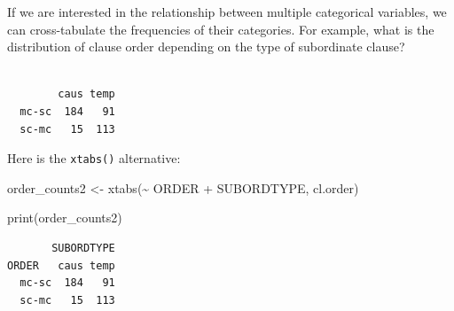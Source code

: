 \documentclass[
  11pt,
  letterpaper,
  DIV=11,
  numbers=noendperiod]{scrreprt}
\newenvironment{Shaded}{\begin{snugshade}}{\end{snugshade}}
\newcommand{\FunctionTok}[1]{\textcolor[rgb]{0.28,0.35,0.67}{#1}}
\newcommand{\NormalTok}[1]{\textcolor[rgb]{0.00,0.23,0.31}{#1}}
\newcommand{\OtherTok}[1]{\textcolor[rgb]{0.00,0.23,0.31}{#1}}
\newcommand{\SpecialCharTok}[1]{\textcolor[rgb]{0.37,0.37,0.37}{#1}}
\begin{document}
If we are interested in the relationship between multiple categorical
variables, we can cross-tabulate the frequencies of their categories.
For example, what is the distribution of clause order depending on the
type of subordinate clause?

\begin{Shaded}
\end{Shaded}

\begin{verbatim}
       
        caus temp
  mc-sc  184   91
  sc-mc   15  113
\end{verbatim}

Here is the \texttt{xtabs()} alternative:

\begin{Shaded}
\begin{Highlighting}[]
\NormalTok{order\_counts2 }\OtherTok{\textless{}{-}} \FunctionTok{xtabs}\NormalTok{(}\SpecialCharTok{\textasciitilde{}}\NormalTok{ ORDER }\SpecialCharTok{+}\NormalTok{ SUBORDTYPE, cl.order)}

\FunctionTok{print}\NormalTok{(order\_counts2)}
\end{Highlighting}
\end{Shaded}

\begin{verbatim}
       SUBORDTYPE
ORDER   caus temp
  mc-sc  184   91
  sc-mc   15  113
\end{verbatim}
\end{document}
